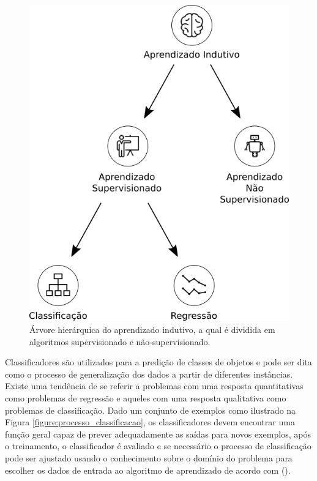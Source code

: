 \begin{figure}[H]
\begin{center}
    \includegraphics[scale=0.40]{images/aprendizado_indutivo.png}
\end{center}
\caption{Árvore hierárquica do aprendizado indutivo, a qual é dividida em 
algoritmos supervisionado e não-supervisionado.}
\label{figure:aprendizado_indutivo}
\end{figure}

Classificadores são utilizados para a predição de classes de objetos e pode ser 
dita como o processo de generalização dos dados a partir de diferentes 
instâncias. Existe uma tendência de se referir a problemas com uma resposta 
quantitativas como problemas de regressão e aqueles com uma resposta 
qualitativa como problemas de classificação. Dado um conjunto de exemplos como 
ilustrado na Figura \ref{figure:processo_classificacao}, os classificadores 
devem encontrar uma função geral capaz de prever adequadamente as saídas para 
novos exemplos, após o treinamento, o classificador é avaliado e se necessário 
o processo de classificação pode ser ajustado usando o conhecimento sobre o 
domínio do problema para escolher os dados de entrada ao algoritmo de 
aprendizado de acordo com  
(\citeyear{porthos_motta:2016}).

